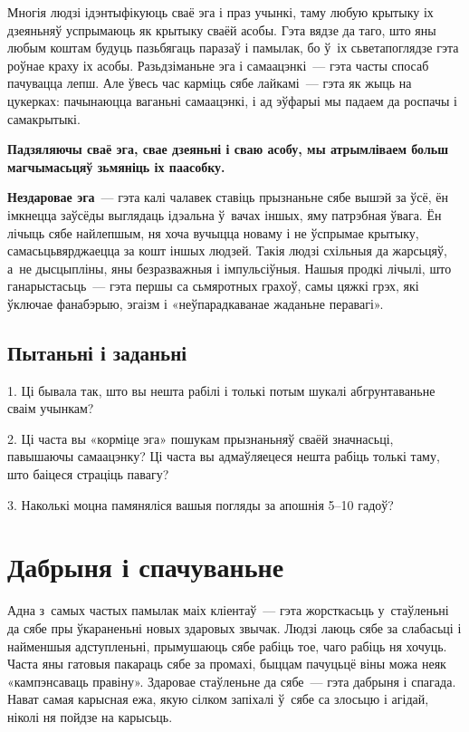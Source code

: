 
Многія людзі ідэнтыфікуюць сваё эга і праз учынкі, таму любую крытыку іх дзеяньняў успрымаюць як крытыку сваёй асобы. Гэта вядзе да таго, што яны любым коштам будуць пазьбягаць паразаў і памылак, бо ў~іх сьветапоглядзе гэта роўнае краху іх асобы. Разьдзіманьне эга і самаацэнкі~--- гэта часты спосаб пачувацца лепш. Але ўвесь час карміць сябе лайкамі~--- гэта як жыць на цукерках: пачынаюцца ваганьні самаацэнкі, і ад эўфарыі мы падаем да роспачы і самакрытыкі.

\textbf{Падзяляючы сваё эга, свае дзеяньні і сваю асобу, мы атрымліваем больш магчымасьцяў зьмяніць іх паасобку.}

\textbf{Нездаровае эга}~--- гэта калі чалавек ставіць прызнаньне сябе вышэй за ўсё, ён імкнецца заўсёды выглядаць ідэальна ў~вачах іншых, яму патрэбная ўвага. Ён лічыць сябе найлепшым, ня хоча вучыцца новаму і не ўспрымае крытыку, самасьцьвярджаецца за кошт іншых людзей. Такія людзі схільныя да жарсьцяў, а~не дысцыпліны, яны безразважныя і імпульсіўныя. Нашыя продкі лічылі, што ганарыстасьць~--- гэта першы са сьмяротных грахоў, самы цяжкі грэх, які ўключае фанабэрыю, эгаізм і «неўпарадкаванае жаданьне перавагі».

\subsection*{Пытаньні і заданьні}

1. Ці бывала так, што вы нешта рабілі і толькі потым шукалі абгрунтаваньне сваім учынкам?

2. Ці часта вы «корміце эга» пошукам прызнаньняў сваёй значнасьці, павышаючы самаацэнку? Ці часта вы адмаўляецеся нешта рабіць толькі таму, што баіцеся страціць павагу?

3. Наколькі моцна памяняліся вашыя погляды за апошнія 5--10 гадоў?


\section{Дабрыня і спачуваньне}

Адна з~самых частых памылак маіх кліентаў~--- гэта жорсткасьць у~стаўленьні да сябе пры ўкараненьні новых здаровых звычак. Людзі лаюць сябе за слабасьці і найменшыя адступленьні, прымушаюць сябе рабіць тое, чаго рабіць ня хочуць. Часта яны гатовыя пакараць сябе за промахі, быццам пачуцьцё віны можа неяк «кампэнсаваць правіну». Здаровае стаўленьне да сябе~--- гэта дабрыня і спагада. Нават самая карысная ежа, якую сілком запіхалі ў~сябе са злосьцю і агідай, ніколі ня пойдзе на карысьць. 

